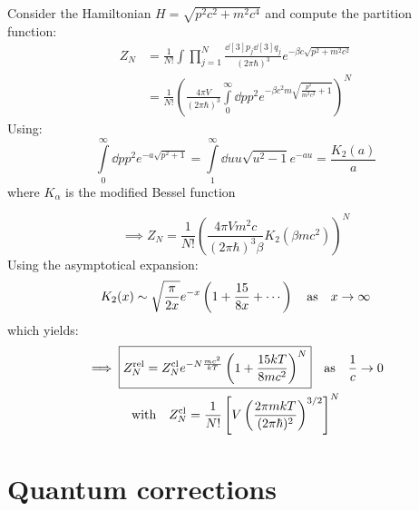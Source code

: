 \documentclass[11pt,a4paper]{scrartcl}
\begin{document}
Consider the Hamiltonian $H=\sqrt{p^2c^2+m^2c^4}$ and compute the partition
function:
\begin{align*}
    Z_N&=\frac{1}{N!}\int\prod_{j=1}^{N}\frac{\dd[3]{p_j}\dd[3]{q_j}}{(2\pi\hbar)^3}
    e^{-\beta c\sqrt{p^2+m^2c^2}}\\
    &=\frac{1}{N!}\left(\frac{4\pi V}{(2\pi\hbar)^3}
    \int\limits_{0}^{\infty}\dd{p}p^2e^{-\beta c^2 m\sqrt{\frac{p^2}{m^2
    c^2}+1}}\right)^N
\end{align*}
Using:
\begin{equation*}
    \int\limits_{0}^{\infty}\dd{p}p^2e^{-a\sqrt{p^2+1}}
    =\int\limits_{1}^{\infty}\dd{u}u\sqrt{u^2-1}e^{-au}
    =\frac{K_2(a)}{a}
\end{equation*}
where $K_{\alpha}$ is the modified Bessel function

\begin{equation*}
    \implies Z_N=\frac{1}{N!}\left(\frac{4\pi Vm^2c}{(2\pi\hbar)^3
    \beta}K_2(\beta m c^2)\right)^N
\end{equation*}
Using the asymptotical expansion:
\begin{equation*}
    K_2(x)\sim\sqrt{\frac{\pi}{2x}}e^{-x}\left(1+\frac{15}{8x}+\cdots\right)
    \qas x\to\infty
\end{equation*}
which yields:
\begin{gather*}
    \implies\boxed{Z_N^{\mathrm{rel}}=Z_N^{\mathrm{cl}}e^{-N\frac{mc^2}{kT}}\left(1+\frac{15kT}{8mc^2}\right)^N}
    \qas \frac{1}{c}\to0 \\
    \qq*{with}Z_N^{\mathrm{cl}}=\frac{1}{N!}\left[V\left(\frac{2\pi
    mkT}{(2\pi\hbar)^2}\right)^{3/2}\right]^N
\end{gather*}

\newpage

\section{Quantum corrections}
\end{document}
